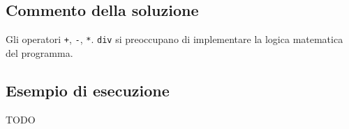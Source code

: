 \subsection{Commento della soluzione}

Gli operatori \texttt{+}, \texttt{-}, \texttt{*}. \texttt{div} si preoccupano di implementare la logica matematica del programma.

\subsection*{Esempio di esecuzione}

TODO
